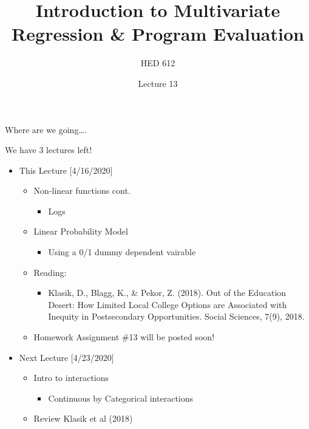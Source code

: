 \documentclass[8pt,ignorenonframetext,dvipsnames]{beamer}
\title{Introduction to Multivariate Regression \& Program Evaluation}
\subtitle{HED 612}
\author{Lecture 13}
\date{}
\providecommand{\tightlist}{%
  \setlength{\itemsep}{0pt}\setlength{\parskip}{0pt}}
\let\olditem\item
\renewcommand{\item}{%
  \olditem\vspace{4pt}
}
\begin{document}
\frame{\titlepage}

\begin{frame}
\tableofcontents[hideallsubsections]
\end{frame}
\begin{frame}{Where are we going\ldots{}.}
\protect\hypertarget{where-are-we-going.}{}

We have 3 lectures left!

\begin{itemize}
\tightlist
\item
  This Lecture {[}4/16/2020{]}

  \begin{itemize}
  \tightlist
  \item
    Non-linear functions cont.

    \begin{itemize}
    \tightlist
    \item
      Logs
    \end{itemize}
  \item
    Linear Probability Model

    \begin{itemize}
    \tightlist
    \item
      Using a 0/1 dummy dependent vairable
    \end{itemize}
  \item
    Reading:

    \begin{itemize}
    \tightlist
    \item
      Klasik, D., Blagg, K., \& Pekor, Z. (2018). Out of the Education
      Desert: How Limited Local College Options are Associated with
      Inequity in Postsecondary Opportunities. Social Sciences, 7(9),
      2018.
    \end{itemize}
  \item
    Homework Assignment \#13 will be posted soon!
  \end{itemize}
\end{itemize}

\medskip

\begin{itemize}
\tightlist
\item
  Next Lecture {[}4/23/2020{]}

  \begin{itemize}
  \tightlist
  \item
    Intro to interactions

    \begin{itemize}
    \tightlist
    \item
      Continuous by Categorical interactions
    \end{itemize}
  \item
    Review Klasik et al (2018)
  \end{itemize}
\end{itemize}


\end{frame}
\end{document}
